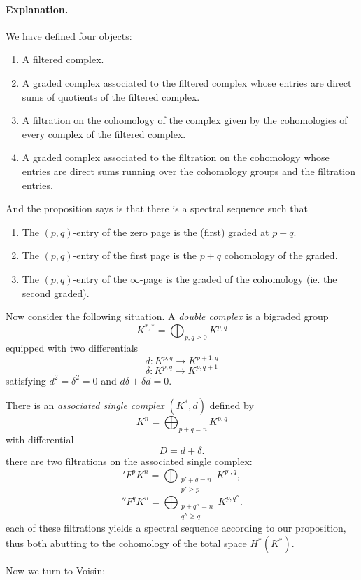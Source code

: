 \paragraph{Explanation.} We have defined four
objects:
\begin{enumerate}
	\item A filtered complex.
	\item A graded complex associated to the
	filtered complex whose entries are direct
	sums of quotients of the filtered complex.
	\item A filtration on the cohomology of the
	complex given by the cohomologies of every
	complex of the filtered complex.
	\item A graded complex associated to the
	filtration on the cohomology whose entries
	are direct sums running over the cohomology
	groups and the filtration entries.
\end{enumerate}
And the proposition says is that there is a
spectral sequence such that
\begin{enumerate}
	\item The $(p,q)$-entry of the zero page is
	the (first) graded at $p+q$.
	\item The $(p,q)$-entry of the first page is
	the $p+q$ cohomology of the graded.
	\item The $(p,q)$-entry of the $\infty$-page
	is the graded of the cohomology
 (ie. the second graded).
\end{enumerate}

Now consider the following situation. A {\it
double complex} is a bigraded group
$$K^{*,*}=\bigoplus_{p,q\geq 0}  K^{p,q}$$
equipped with two differentials
$$d:K^{p,q}\to K^{p+1,q}$$
$$\delta:K^{p,q}\to K^{p,q+1}$$
satisfying $d^2=\delta^2=0$ and $d\delta
+\delta d=0$.

There is an {\it associated single complex}
$(K^*,d)$ defined by
$$K^n=\bigoplus_{p+q=n} K^{p,q} $$
with differential
$$D=d+\delta.$$
there are two filtrations on the associated
single complex:
$$'F^pK^n=\bigoplus_{\substack{p'+q=n\\p'\geq
p}}K^{p',q},$$
	$$''F^qK^n=\bigoplus_{\substack{p+q''=
	n\\q''\geq
	q}}K^{p,q''}.$$
each of these filtrations yields a spectral
sequence according to our proposition, thus
both abutting to the cohomology of the total
space $H^{*}(K^*)$.

Now we turn to Voisin:


